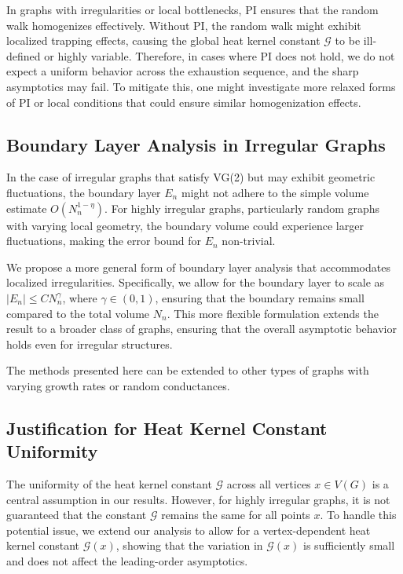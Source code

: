 \documentclass{article}
\numberwithin{equation}{section}
\theoremstyle{definition}
\theoremstyle{remark}
\newcommand{\cG}{\mathcal{G}}    %
\begin{document}
In graphs with irregularities or local bottlenecks, PI ensures that the random walk homogenizes effectively. Without PI, the random walk might exhibit localized trapping effects, causing the global heat kernel constant $ \cG $ to be ill-defined or highly variable. Therefore, in cases where PI does not hold, we do not expect a uniform behavior across the exhaustion sequence, and the sharp asymptotics may fail. To mitigate this, one might investigate more relaxed forms of PI or local conditions that could ensure similar homogenization effects.

\subsection{Boundary Layer Analysis in Irregular Graphs}
In the case of irregular graphs that satisfy VG(2) but may exhibit geometric fluctuations, the boundary layer $ E_n $ might not adhere to the simple volume estimate $ O(N_n^{1-\eta}) $. For highly irregular graphs, particularly random graphs with varying local geometry, the boundary volume could experience larger fluctuations, making the error bound for $ E_n $ non-trivial.

We propose a more general form of boundary layer analysis that accommodates localized irregularities. Specifically, we allow for the boundary layer to scale as $ |E_n| \leq C N_n^\gamma $, where $ \gamma \in (0,1) $, ensuring that the boundary remains small compared to the total volume $ N_n $. This more flexible formulation extends the result to a broader class of graphs, ensuring that the overall asymptotic behavior holds even for irregular structures.

The methods presented here can be extended to other types of graphs with varying growth rates or random conductances.

\subsection{Justification for Heat Kernel Constant Uniformity}
The uniformity of the heat kernel constant $ \cG $ across all vertices $ x \in V(G) $ is a central assumption in our results. However, for highly irregular graphs, it is not guaranteed that the constant $ \cG $ remains the same for all points $ x $. To handle this potential issue, we extend our analysis to allow for a vertex-dependent heat kernel constant $ \cG(x) $, showing that the variation in $ \cG(x) $ is sufficiently small and does not affect the leading-order asymptotics.
\end{document}
